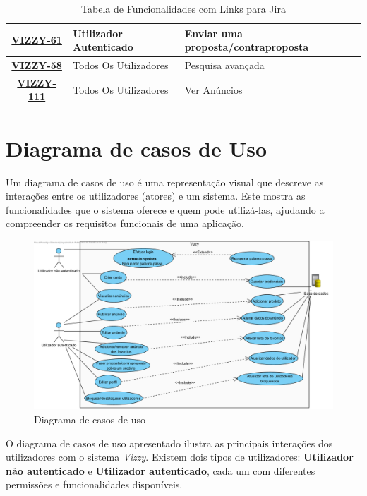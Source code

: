 \documentclass[a4paper, 12pt]{article} %
\begin{document}
\begin{table}[H]
{\begin{tabular}{|c|l|l|}
			\hline
			\href{https://basigraphics.atlassian.net/browse/VIZZY-61}{\textbf{VIZZY-61}} & Utilizador Autenticado & Enviar uma proposta/contraproposta \\			
			\hline
			\href{https://basigraphics.atlassian.net/browse/VIZZY-58}{\textbf{VIZZY-58}} & Todos Os Utilizadores & Pesquisa avançada \\
			\hline
			\href{https://basigraphics.atlassian.net/browse/VIZZY-111}{\textbf{VIZZY-111}} & Todos Os Utilizadores & Ver Anúncios \\
			\hline
		\end{tabular}%
	}
	\caption{Tabela de Funcionalidades com Links para Jira}
	\label{tab:funcionalidades_jira}
\end{table}

\newpage
\section{Diagrama de casos de Uso}

Um diagrama de casos de uso é uma representação visual que descreve as interações entre os utilizadores (atores) e um sistema. Este mostra as funcionalidades que o sistema oferece e quem pode utilizá-las, ajudando a compreender os requisitos funcionais de uma aplicação.


\begin{figure}[ht]
	\centering
	\includegraphics[width=\textwidth]{../images/use-case.png}
	\caption{Diagrama de casos de uso}
	\label{fig:casos de uso}
\end{figure}

O diagrama de casos de uso apresentado ilustra as principais interações dos utilizadores com o sistema \textit{Vizzy}. Existem dois tipos de utilizadores: \textbf{Utilizador não autenticado} e \textbf{Utilizador autenticado}, cada um com diferentes permissões e funcionalidades disponíveis.
\end{document}
